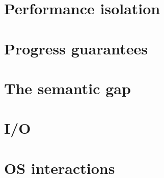 \section{Performance isolation}
\section{Progress guarantees}\label{sec:progress}
\section{The semantic gap}\label{sec:semantic}
\section{I/O}
\section{OS interactions}
